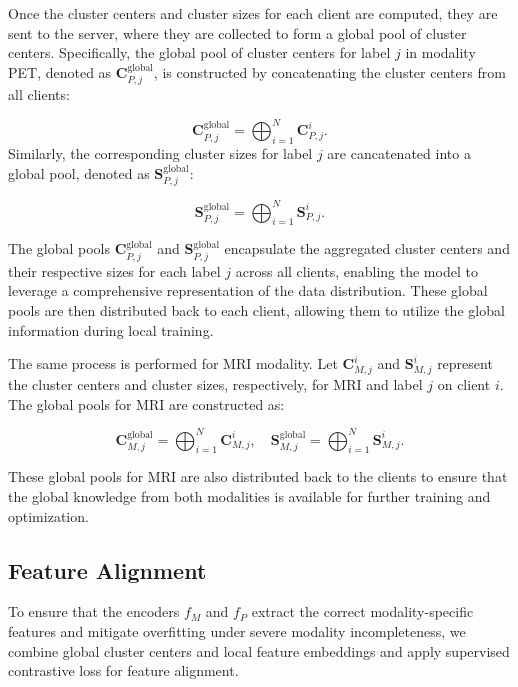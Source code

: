 Once the cluster centers and cluster sizes for each client are computed, they are sent to the server, where they are collected to form a global pool of cluster centers. Specifically, the global pool of cluster centers for label \( j \) in modality PET, denoted as \( \mathbf{C}_{P,j}^{\text{global}} \), is constructed by concatenating the cluster centers from all clients:

\begin{equation}
    \mathbf{C}_{P,j}^{\text{global}} = \bigoplus_{i=1}^N \mathbf{C}_{P,j}^i.
\end{equation}
Similarly, the corresponding cluster sizes for label \( j \) are cancatenated into a global pool, denoted as \( \mathbf{S}_{P,j}^{\text{global}} \):

\begin{equation}
    \mathbf{S}_{P,j}^{\text{global}} = \bigoplus_{i=1}^N \mathbf{S}_{P,j}^i.
\end{equation}

The global pools \( \mathbf{C}_{P,j}^{\text{global}} \) and \( \mathbf{S}_{P,j}^{\text{global}} \) encapsulate the aggregated cluster centers and their respective sizes for each label \( j \) across all clients, enabling the model to leverage a comprehensive representation of the data distribution. These global pools are then distributed back to each client, allowing them to utilize the global information during local training.

The same process is performed for MRI modality. Let \( \mathbf{C}_{M,j}^i \) and \( \mathbf{S}_{M,j}^i \) represent the cluster centers and cluster sizes, respectively, for MRI and label \( j \) on client \( i \). The global pools for MRI are constructed as:

\begin{equation}
    \mathbf{C}_{M,j}^{\text{global}} = \bigoplus_{i=1}^N \mathbf{C}_{M,j}^i, \quad \mathbf{S}_{M,j}^{\text{global}} = \bigoplus_{i=1}^N \mathbf{S}_{M,j}^i.
\end{equation}

These global pools for MRI are also distributed back to the clients to ensure that the global knowledge from both modalities is available for further training and optimization.

\subsection{Feature Alignment}

To ensure that the encoders \( f_M \) and \( f_P \) extract the correct modality-specific features and mitigate overfitting under severe modality incompleteness, we combine global cluster centers and local feature embeddings and apply supervised contrastive loss for feature alignment.

